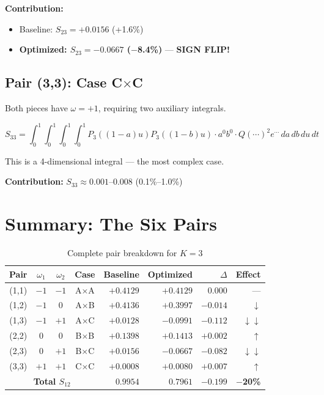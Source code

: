 \documentclass[11pt]{article}
\begin{document}
\textbf{Contribution:}
\begin{itemize}
\item Baseline: $S_{23} = +0.0156$ (+1.6\%)
\item \textbf{Optimized: $S_{23} = -0.0667$ ($-$8.4\%)} --- \textbf{SIGN FLIP!}
\end{itemize}

\subsection{Pair (3,3): Case C$\times$C}

Both pieces have $\omega = +1$, requiring two auxiliary integrals.

\begin{equation}
S_{33} = \int_0^1 \int_0^1 \int_0^1 \int_0^1 P_3((1-a)u) P_3((1-b)u) \cdot a^0 b^0 \cdot Q(\cdots)^2 e^{\cdots} \, da\, db\, du\, dt
\end{equation}

This is a 4-dimensional integral --- the most complex case.

\textbf{Contribution:} $S_{33} \approx 0.001$--$0.008$ (0.1\%--1.0\%)

\section{Summary: The Six Pairs}

\begin{table}[h]
\centering
\caption{Complete pair breakdown for $K=3$}
\begin{tabular}{ccccrrrr}
\toprule
Pair & $\omega_1$ & $\omega_2$ & Case & Baseline & Optimized & $\Delta$ & Effect \\
\midrule
(1,1) & $-1$ & $-1$ & A$\times$A & $+0.4129$ & $+0.4129$ & $0.000$ & --- \\
(1,2) & $-1$ & $0$ & A$\times$B & $+0.4136$ & $+0.3997$ & $-0.014$ & $\downarrow$ \\
(1,3) & $-1$ & $+1$ & A$\times$C & $+0.0128$ & $\mathbf{-0.0991}$ & $-0.112$ & $\downarrow\downarrow$ \\
(2,2) & $0$ & $0$ & B$\times$B & $+0.1398$ & $+0.1413$ & $+0.002$ & $\uparrow$ \\
(2,3) & $0$ & $+1$ & B$\times$C & $+0.0156$ & $\mathbf{-0.0667}$ & $-0.082$ & $\downarrow\downarrow$ \\
(3,3) & $+1$ & $+1$ & C$\times$C & $+0.0008$ & $+0.0080$ & $+0.007$ & $\uparrow$ \\
\midrule
\multicolumn{4}{c}{\textbf{Total $S_{12}$}} & $0.9954$ & $0.7961$ & $-0.199$ & \textbf{$-$20\%} \\
\bottomrule
\end{tabular}
\end{table}
\end{document}
